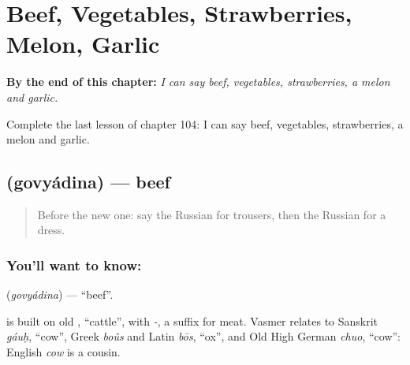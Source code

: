 
\chapter{Beef, Vegetables, Strawberries, Melon, Garlic}
\label{ch:ru-beef-vegetables-strawberries-melon-garlic}

\begin{chapteropening}
\textbf{By the end of this chapter:} \emph{I can say beef, vegetables, strawberries, a melon and garlic.}

Complete the last lesson of chapter 104: I can say beef, vegetables, strawberries, a melon and garlic.
\end{chapteropening}

\section[\texorpdfstring{\ru{говядина} (govyádina)}{говядина (govyádina)}]{ (govyádina) — beef}

\label{lesson:RU-C104-beef}



\begin{quote}
Before the new one: say the Russian for trousers, then the Russian for a dress.
\end{quote}

\subsection*{You'll want to know: }
\textbf{} (\emph{govyádina}) — \textquotedblleft{}beef\textquotedblright{}.

\begin{cousinweb}
\textbf{} is built on old \emph{}, \textquotedblleft{}cattle\textquotedblright{}, with \emph{-}, a suffix for meat. Vasmer relates \emph{} to Sanskrit \emph{gáuḥ}, \textquotedblleft{}cow\textquotedblright{}, Greek \emph{boûs} and Latin \emph{bōs}, \textquotedblleft{}ox\textquotedblright{}, and Old High German \emph{chuo}, \textquotedblleft{}cow\textquotedblright{}: English \emph{cow} is a cousin.
\end{cousinweb}

